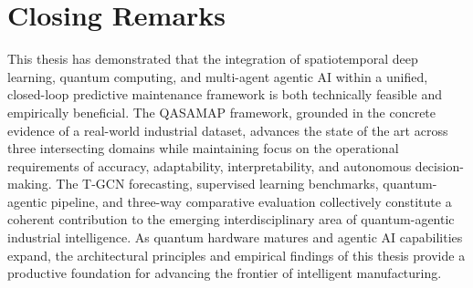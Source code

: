\section{Closing Remarks}

This thesis has demonstrated that the integration of spatiotemporal deep learning, quantum computing, and multi-agent agentic AI within a unified, closed-loop predictive maintenance framework is both technically feasible and empirically beneficial. The QASAMAP framework, grounded in the concrete evidence of a real-world industrial dataset, advances the state of the art across three intersecting domains while maintaining focus on the operational requirements of accuracy, adaptability, interpretability, and autonomous decision-making. The T-GCN forecasting, supervised learning benchmarks, quantum-agentic pipeline, and three-way comparative evaluation collectively constitute a coherent contribution to the emerging interdisciplinary area of quantum-agentic industrial intelligence. As quantum hardware matures and agentic AI capabilities expand, the architectural principles and empirical findings of this thesis provide a productive foundation for advancing the frontier of intelligent manufacturing.
